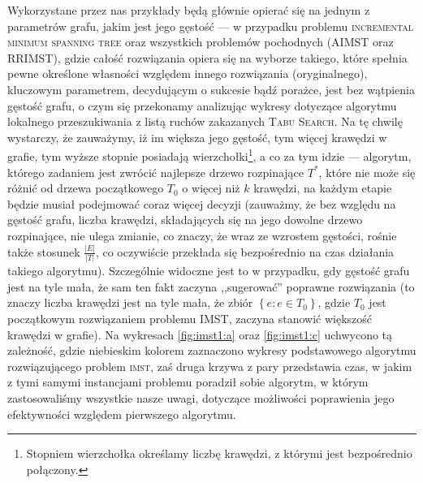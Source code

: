 Wykorzystane przez nas przykłady będą głównie opierać się na jednym z parametrów grafu, jakim jest jego gęstość --- w przypadku problemu \textsc{incremental minimum spanning tree} oraz wszystkich problemów pochodnych (\textsc{AIMST} oraz \textsc{RRIMST}), gdzie całość rozwiązania opiera się na wyborze takiego, które spełnia pewne określone własności względem innego rozwiązania (oryginalnego), kluczowym parametrem, decydującym o sukcesie bądź porażce, jest bez wątpienia gęstość grafu, o czym się przekonamy analizując wykresy dotyczące algorytmu lokalnego przeszukiwania z listą ruchów zakazanych \textsc{Tabu Search}. Na tę chwilę wystarczy, że zauważymy, iż im większa jego gęstość, tym więcej krawędzi w grafie, tym wyższe stopnie posiadają wierzchołki\footnote{Stopniem wierzchołka określamy liczbę krawędzi, z którymi jest bezpośrednio połączony.}, a co za tym idzie --- algorytm, którego zadaniem jest zwrócić najlepsze drzewo rozpinające $T^{\ast}$, które nie może się różnić od drzewa początkowego $T_{0}$ o więcej niż $k$ krawędzi, na każdym etapie będzie musiał podejmować coraz więcej decyzji (zauważmy, że bez względu na gęstość grafu, liczba krawędzi, składających się na jego dowolne drzewo rozpinające, nie ulega zmianie, co znaczy, że wraz ze wzrostem gęstości, rośnie także stosunek $\frac{\left| E \right|}{\left| T \right|}$, co oczywiście przekłada się bezpośrednio na czas działania takiego algorytmu). Szczególnie widoczne jest to w przypadku, gdy gęstość grafu jest na tyle mała, że sam ten fakt zaczyna ,,sugerować'' poprawne rozwiązania (to znaczy liczba krawędzi jest na tyle mała, że zbiór $\left\{ e : e \in T_{0} \right\}$, gdzie $T_{0}$ jest początkowym rozwiązaniem problemu \textsc{IMST}, zaczyna stanowić większość krawędzi w grafie). Na wykresach \ref{fig:imst1:a} oraz \ref{fig:imst1:c} uchwycono tą zależność, gdzie niebieskim kolorem zaznaczono wykresy podstawowego algorytmu rozwiązującego problem \textsc{imst}, zaś druga krzywa z pary przedstawia czas, w jakim z tymi samymi instancjami problemu poradził sobie algorytm, w którym zastosowaliśmy wszystkie nasze uwagi, dotyczące możliwości poprawienia jego efektywności względem pierwszego algorytmu.


